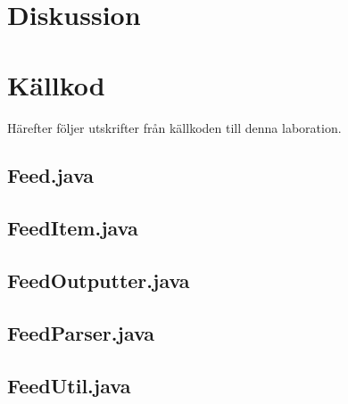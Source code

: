 \documentclass[a4paper, 12pt]{article}
\begin{document}
\section{Diskussion}\label{Diskussion}


\newpage
\appendix
{}
\section{Källkod}\label{Kallkod}
Härefter följer utskrifter från källkoden till denna laboration.

\subsection{Feed.java}\label{Feed.java}
\begin{footnotesize}
  
\end{footnotesize}

\newpage
\subsection{FeedItem.java}\label{FeedItem.java}
\begin{footnotesize}
  
\end{footnotesize}

\newpage
\subsection{FeedOutputter.java}\label{FeedOutputter.java}
\begin{footnotesize}
  
\end{footnotesize}

\newpage
\subsection{FeedParser.java}\label{FeedParser.java}
\begin{footnotesize}
  
\end{footnotesize}

\newpage
\subsection{FeedUtil.java}\label{FeedUtil.java}
\begin{footnotesize}
  
\end{footnotesize}
\end{document}
